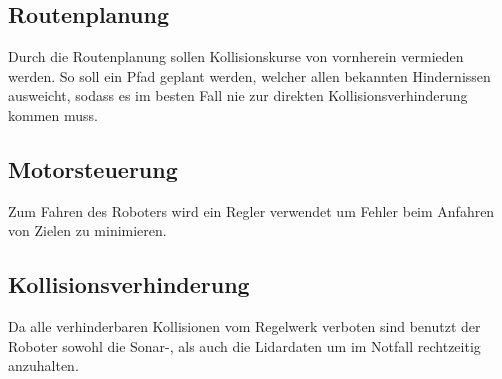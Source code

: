 \documentclass[12pt]{article}
\begin{document}
\subsection{Routenplanung}
Durch die Routenplanung sollen Kollisionskurse von vornherein vermieden werden. So soll ein Pfad geplant werden, welcher allen bekannten Hindernissen ausweicht, sodass es im besten Fall nie zur direkten Kollisionsverhinderung kommen muss.

\subsection{Motorsteuerung}
Zum Fahren des Roboters wird ein Regler verwendet um Fehler beim Anfahren von Zielen zu minimieren.

\subsection{Kollisionsverhinderung}
Da alle verhinderbaren Kollisionen vom Regelwerk verboten sind benutzt der Roboter sowohl die Sonar-, als auch die Lidardaten um im Notfall rechtzeitig anzuhalten.
\end{document}
